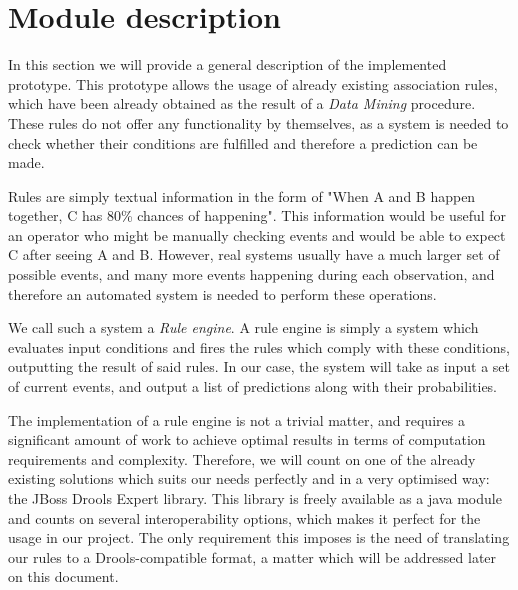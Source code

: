 \documentclass[a4paper,12pt]{article}
\begin{document}
\cleardoublepage
{} %
\listoftables %
\cleardoublepage

\setcounter{page}{1}

\section{Module description}
\label{sec:module_description}
In this section we will provide a general description of the implemented prototype. This prototype allows the usage of already existing association rules, which have been already obtained as the result of a \emph{Data Mining}\cite{torgo2003data}\cite{han2006data} procedure. These rules do not offer any functionality by themselves, as a system is needed to check whether their conditions are fulfilled and therefore a prediction can be made.

Rules are simply textual information in the form of "When A and B happen together, C has 80\% chances of happening". This information would be useful for an operator who might be manually checking events and would be able to expect C after seeing A and B. However, real systems usually have a much larger set of possible events, and many more events happening during each observation, and therefore an automated system is needed to perform these operations.

We call such a system a \emph{Rule engine}\cite{liang2009openrulebench}. A rule engine is simply a system which evaluates input conditions and fires the rules which comply with these conditions, outputting the result of said rules. In our case, the system will take as input a set of current events, and output a list of predictions along with their probabilities.

The implementation of a rule engine is not a trivial matter, and requires a significant amount of work to achieve optimal results in terms of computation requirements and complexity. Therefore, we will count on one of the already existing solutions which suits our needs perfectly and in a very optimised way: the JBoss Drools Expert library\cite{browne2009jboss}. This library is freely available as a java module and counts on several interoperability options, which makes it perfect for the usage in our project. The only requirement this imposes is the need of translating our rules to a Drools-compatible format, a matter which will be addressed later on this document.
\end{document}
